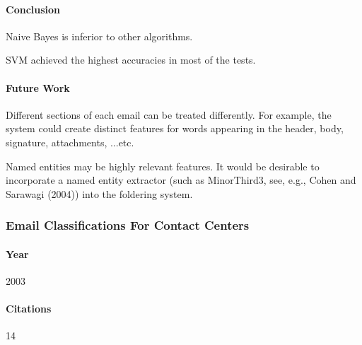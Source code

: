 \documentclass[12pt]{article}
\newenvironment{my_itemize}
{\begin{itemize}
  \setlength{\itemsep}{0cm}
  \setlength{\parskip}{0cm}}
{\end{itemize}}
\begin{document}
\paragraph{Conclusion}
\begin{my_itemize}
    \item Naive Bayes is inferior to other algorithms.
    \item SVM achieved the highest accuracies in most of the tests.
\end{my_itemize}

\paragraph{Future Work}
\begin{my_itemize}
    \item Different sections of each email can be treated differently. 
	  For example, the system could create distinct features for words appearing 
	  in the header, body, signature, attachments, ...etc.
    \item Named entities may be highly relevant features. It would be desirable to 
	  incorporate a named entity extractor (such as MinorThird3, see, e.g., 
	  Cohen and Sarawagi (2004)) into the foldering system.
\end{my_itemize}


\subsubsection{Email Classifications For Contact Centers \cite{ANI03}}
\paragraph{Year} 2003
\paragraph{Citations} 14
\end{document}

